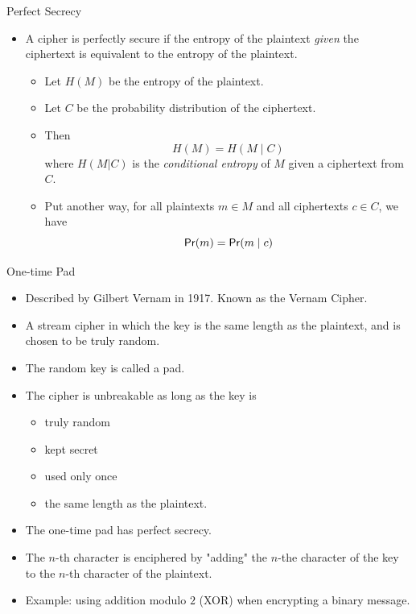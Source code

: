 \documentclass[presentation]{beamer}
\begin{document}
\begin{frame}[label=sec-7]{Perfect Secrecy}
\begin{itemize}[<+->]
\item A cipher is perfectly secure if the entropy of the plaintext \emph{given} the ciphertext is equivalent to the entropy of the plaintext.
\begin{itemize}
\item Let $H(M)$ be the entropy of the plaintext.
\item Let $C$ be the probability distribution of the ciphertext.
\item Then 
\begin{equation*}
H(M) = H(M \mid C)
\end{equation*} where $H(M | C)$ is the \emph{conditional entropy} of $M$ given a ciphertext from $C$.
\item Put another way, for all plaintexts $m \in M$ and all ciphertexts $c \in C$, we have
\begin{equation*}
 \mathsf{Pr}(m) = \mathsf{Pr}(m \mid c)
\end{equation*}
\end{itemize}
\end{itemize}
\end{frame}
\begin{frame}[label=sec-8]{One-time Pad}
\begin{itemize}[<+->]
\item Described by Gilbert Vernam in 1917. Known as the Vernam Cipher.
\item A stream cipher in which the key is the same length as the plaintext, and is chosen to be truly random.
\item The random key is called a pad.
\item The cipher is unbreakable as long as the key is
\begin{itemize}
\item truly random
\item kept secret
\item used only once
\item the same length as the plaintext.
\end{itemize}
\item The one-time pad has perfect secrecy.
\item The $n$-th character is enciphered by "adding" the $n$-the character of the key to the $n$-th character of the plaintext.
\item Example: using addition modulo $2$ (XOR) when encrypting a binary message.
\end{itemize}
\end{frame}
\end{document}
